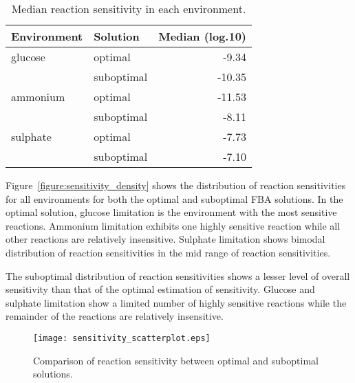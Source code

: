 \begin{table}%
  \centering
  \begin{tabular}{l l r}
                                                  \toprule
    Environment & Solution   & Median (log.10) \\ \midrule
    glucose     & optimal    &  -9.34          \\
                & suboptimal & -10.35          \\
    ammonium    & optimal    & -11.53          \\
                & suboptimal &  -8.11          \\
    sulphate    & optimal    &  -7.73          \\
                & suboptimal &  -7.10          \\ \bottomrule
  \end{tabular}
  \caption[Median reaction sensitivities]{Median reaction sensitivity in each environment. }
  \label{table:median_sensitivity}
\end{table}%

Figure~\vref{figure:sensitivity_density} shows the distribution of reaction sensitivities for all environments for both the optimal and suboptimal FBA solutions. In the optimal solution, glucose limitation is the environment with the most sensitive reactions. Ammonium limitation exhibits one highly sensitive reaction while all other reactions are relatively insensitive. Sulphate limitation shows bimodal distribution of reaction sensitivities in the mid range of reaction sensitivities. 

The suboptimal distribution of reaction sensitivities shows a lesser level of overall sensitivity than that of the optimal estimation of sensitivity. Glucose and sulphate limitation show a limited number of highly sensitive reactions while the remainder of the reactions are relatively insensitive.

\begin{figure}%
  \centering
  \texttt{[image: sensitivity\_scatterplot.eps]}
  \caption[Comparison of reaction sensitivity between optimal and suboptimal solutions]{Comparison of reaction sensitivity between optimal and suboptimal solutions. }
  \label{figure:sensitivity_scatterplot}
\end{figure}%

